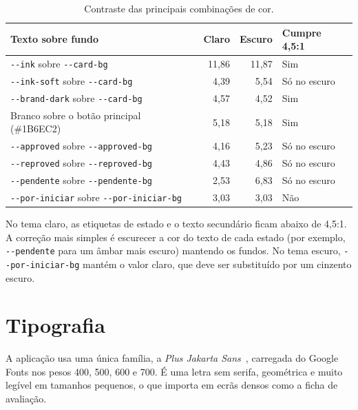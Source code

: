 \begin{table}[H]
    \centering
    \small
    \begin{tabularx}{\linewidth}{Xrrl}
        \toprule
        \textbf{Texto sobre fundo} & \textbf{Claro} & \textbf{Escuro} & \textbf{Cumpre 4,5:1} \\
        \midrule
        \texttt{-{}-ink} sobre \texttt{-{}-card-bg} & 11,86 & 11,87 & Sim \\
        \texttt{-{}-ink-soft} sobre \texttt{-{}-card-bg} & 4,39 & 5,54 & Só no escuro \\
        \texttt{-{}-brand-dark} sobre \texttt{-{}-card-bg} & 4,57 & 4,52 & Sim \\
        Branco sobre o botão principal (\#1B6EC2) & 5,18 & 5,18 & Sim \\
        \texttt{-{}-approved} sobre \texttt{-{}-approved-bg} & 4,16 & 5,23 & Só no escuro \\
        \texttt{-{}-reproved} sobre \texttt{-{}-reproved-bg} & 4,43 & 4,86 & Só no escuro \\
        \texttt{-{}-pendente} sobre \texttt{-{}-pendente-bg} & 2,53 & 6,83 & Só no escuro \\
        \texttt{-{}-por-iniciar} sobre \texttt{-{}-por-iniciar-bg} & 3,03 & 3,03 & Não \\
        \bottomrule
    \end{tabularx}
    \caption{Contraste das principais combinações de cor.}
    \label{tab:contraste}
\end{table}

No tema claro, as etiquetas de estado e o texto secundário ficam abaixo de 4,5:1. A correção mais simples é escurecer a cor do texto de cada estado (por exemplo, \texttt{-{}-pendente} para um âmbar mais escuro) mantendo os fundos. No tema escuro, \texttt{-{}-por-iniciar-bg} mantém o valor claro, que deve ser substituído por um cinzento escuro.

\section{Tipografia}

A aplicação usa uma única família, a \emph{Plus Jakarta Sans}~\citep{plus-jakarta-sans}, carregada do Google Fonts nos pesos 400, 500, 600 e 700. É uma letra sem serifa, geométrica e muito legível em tamanhos pequenos, o que importa em ecrãs densos como a ficha de avaliação.

